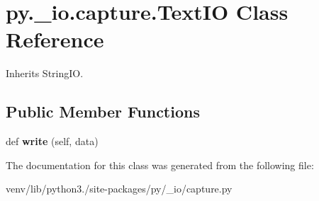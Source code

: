 \hypertarget{classpy_1_1__io_1_1capture_1_1_text_i_o}{}\section{py.\+\_\+io.\+capture.\+Text\+IO Class Reference}
\label{classpy_1_1__io_1_1capture_1_1_text_i_o}


Inherits String\+IO.

\subsection*{Public Member Functions}
\begin{DoxyCompactItemize}
\item 
\mbox{\label{classpy_1_1__io_1_1capture_1_1_text_i_o_a0cea300e62062624c8c49373611cc9ca}} 
def {\bfseries write} (self, data)
\end{DoxyCompactItemize}


The documentation for this class was generated from the following file\+:\begin{DoxyCompactItemize}
\item 
venv/lib/python3./site-\/packages/py/\+\_\+io/capture.\+py\end{DoxyCompactItemize}
